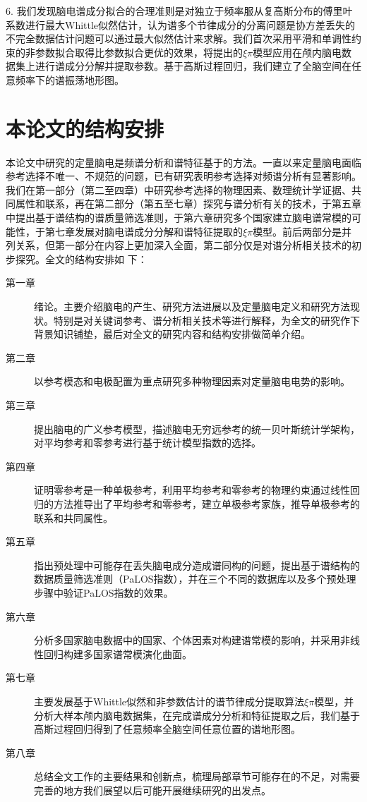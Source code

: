 6. 我们发现脑电谱成分拟合的合理准则是对独立于频率服从复高斯分布的傅里叶系数进行最大Whittle似然估计，认为谱多个节律成分的分离问题是协方差丢失的不完全数据估计问题可以通过最大似然估计来求解。我们首次采用平滑和单调性约束的非参数拟合取得比参数拟合更优的效果，将提出的$\xi\pi$模型应用在颅内脑电数据集上进行谱成分分解并提取参数。基于高斯过程回归，我们建立了全脑空间在任意频率下的谱振荡地形图。

\section{本论文的结构安排}
本论文中研究的定量脑电是频谱分析和谱特征基于的方法。一直以来定量脑电面临参考选择不唯一、不规范的问题，已有研究表明参考选择对频谱分析有显著影响。我们在第一部分（第二至四章）中研究参考选择的物理因素、数理统计学证据、共同属性和联系，再在第二部分（第五至七章）探究与谱分析有关的技术，于第五章中提出基于谱结构的谱质量筛选准则，于第六章研究多个国家建立脑电谱常模的可能性，于第七章发展对脑电谱成分分解和谱特征提取的$\xi\pi$模型。前后两部分是并列关系，但第一部分在内容上更加深入全面，第二部分仅是对谱分析相关技术的初步探究。全文的结构安排如
下：
\begin{description}
	\item[第一章] 绪论。主要介绍脑电的产生、研究方法进展以及定量脑电定义和研究方法现状。特别是对关键词参考、谱分析相关技术等进行解释，为全文的研究作下背景知识铺垫，最后对全文的研究内容和结构安排做简单介绍。
	\item[第二章] 以参考模态和电极配置为重点研究多种物理因素对定量脑电电势的影响。
	\item[第三章] 提出脑电的广义参考模型，描述脑电无穷远参考的统一贝叶斯统计学架构，对平均参考和零参考进行基于统计模型指数的选择。
	\item[第四章] 证明零参考是一种单极参考，利用平均参考和零参考的物理约束通过线性回归的方法推导出了平均参考和零参考，建立单极参考家族，推导单极参考的联系和共同属性。
	\item[第五章] 指出预处理中可能存在丢失脑电成分造成谱同构的问题，提出基于谱结构的数据质量筛选准则（PaLOS指数），并在三个不同的数据库以及多个预处理步骤中验证PaLOS指数的效果。
    \item[第六章] 分析多国家脑电数据中的国家、个体因素对构建谱常模的影响，并采用非线性回归构建多国家谱常模演化曲面。
	\item[第七章] 主要发展基于Whittle似然和非参数估计的谱节律成分提取算法$\xi\pi$模型，并分析大样本颅内脑电数据集，在完成谱成分分析和特征提取之后，我们基于高斯过程回归得到了任意频率全脑空间任意位置的谱地形图。
	\item[第八章] 总结全文工作的主要结果和创新点，梳理局部章节可能存在的不足，对需要完善的地方我们展望以后可能开展继续研究的出发点。
\end{description}